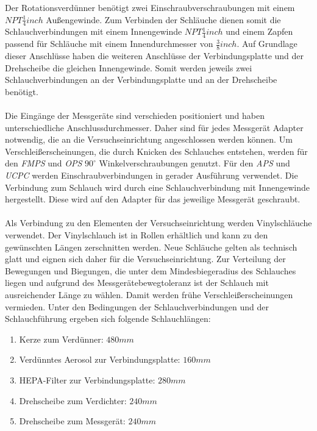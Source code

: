 Der Rotationsverd\"{u}nner ben\"{o}tigt zwei Einschraubverschraubungen mit einem \(\textit{NPT} \frac{1}{4} inch\) Au{\ss}engewinde. Zum Verbinden der Schl\"{a}uche dienen somit die Schlauchverbindungen mit einem Innengewinde \(\textit{NPT} \frac{1}{4} inch\) und einem Zapfen passend f\"{u}r Schl\"{a}uche mit einem Innendurchmesser von \(\frac{3}{8} inch\). Auf Grundlage dieser Anschl\"{u}sse haben die weiteren Anschl\"{u}sse der Verbindungsplatte und der Drehscheibe die gleichen Innengewinde. Somit werden jeweils zwei Schlauchverbindungen an der Verbindungsplatte und an der Drehscheibe ben\"{o}tigt.
\\\\
Die Eing\"{a}nge der Messger\"{a}te sind verschieden positioniert und haben unterschiedliche Anschlussdurchmesser. Daher sind f\"{u}r jedes Messger\"{a}t Adapter notwendig, die an die Versuchseinrichtung angeschlossen werden k\"{o}nnen. Um Verschlei{\ss}erscheinungen, die durch Knicken des Schlauches entstehen, werden f\"{u}r den \textit{FMPS} und \textit{OPS} \(90^\circ\) Winkelverschraubungen genutzt. F\"{u}r den \textit{APS} und \textit{UCPC} werden Einschraubverbindungen in gerader Ausf\"{u}hrung verwendet. Die Verbindung zum Schlauch wird durch eine Schlauchverbindung mit Innengewinde hergestellt. Diese wird auf den Adapter f\"{u}r das jeweilige Messger\"{a}t geschraubt.
\\\\
Als Verbindung zu den Elementen der Versuchseinrichtung werden Vinylschl\"{a}uche verwendet. Der Vinylschlauch ist in Rollen erh\"{a}ltlich und kann zu den gew\"{u}nschten L\"{a}ngen zerschnitten werden. Neue Schl\"{a}uche gelten als technisch glatt\citep{grote} und eignen sich daher f\"{u}r die Versuchseinrichtung. Zur Verteilung der Bewegungen und Biegungen, die unter dem Mindesbiegeradius des Schlauches liegen und aufgrund des Messger\"{a}tebewegtoleranz ist der Schlauch mit ausreichender L\"{a}nge zu w\"{a}hlen. Damit werden fr\"{u}he Verschlei{\ss}erscheinungen vermieden. Unter den Bedingungen der Schlauchverbindungen und der Schlauchf\"{u}hrung ergeben sich folgende Schlauchl\"{a}ngen:
\begin{enumerate}
	\item Kerze zum Verd\"{u}nner: \(480mm\)
	\item Verd\"{u}nntes Aerosol zur Verbindungsplatte: \(160mm\)
	\item HEPA-Filter zur Verbindungsplatte: \(280mm\)
	\item Drehscheibe zum Verdichter: \(240mm\)
	\item Drehscheibe zum Messger\"{a}t: \(240mm\)
\end{enumerate}

